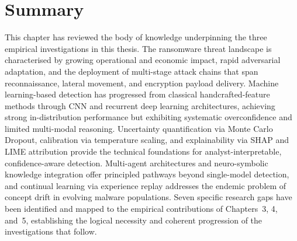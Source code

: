 \section{Summary}
\label{sec:lit_summary}

This chapter has reviewed the body of knowledge underpinning the three empirical investigations
in this thesis.
The ransomware threat landscape is characterised by growing operational and economic impact,
rapid adversarial adaptation, and the deployment of multi-stage attack chains that span
reconnaissance, lateral movement, and encryption payload delivery.
Machine learning-based detection has progressed from classical handcrafted-feature methods
through CNN and recurrent deep learning architectures, achieving strong in-distribution
performance but exhibiting systematic overconfidence and limited multi-modal reasoning.
Uncertainty quantification via Monte Carlo Dropout, calibration via temperature scaling, and
explainability via SHAP and LIME attribution provide the technical foundations for
analyst-interpretable, confidence-aware detection.
Multi-agent architectures and neuro-symbolic knowledge integration offer principled pathways
beyond single-model detection, and continual learning via experience replay addresses the
endemic problem of concept drift in evolving malware populations.
Seven specific research gaps have been identified and mapped to the empirical contributions
of Chapters~3, 4, and~5, establishing the logical necessity and coherent progression of the
investigations that follow.
